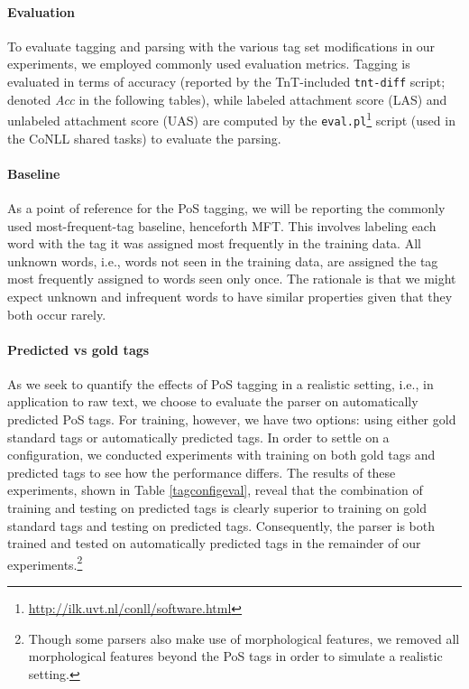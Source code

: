 \documentclass[11pt,a4paper]{article}
\begin{document}
\paragraph{Evaluation}
To evaluate tagging and parsing with the various tag set modifications in our
experiments, we employed commonly used evaluation metrics. Tagging is evaluated
in terms of accuracy (reported by the TnT-included \texttt{tnt-diff} script;
denoted \emph{Acc} in the following tables), while labeled attachment score
(LAS) and unlabeled attachment score (UAS) are computed by the
\texttt{eval.pl}\footnote{\url{http://ilk.uvt.nl/conll/software.html}} script
(used in the CoNLL shared tasks) to evaluate the parsing.

\paragraph{Baseline}
As a point of reference for the PoS tagging, we will be reporting the commonly
used most-frequent-tag baseline, henceforth MFT. This involves labeling each
word with the tag it was assigned most frequently in the training data. All
unknown words, i.e., words not seen in the training data, are assigned the tag
most frequently assigned to words seen only once. The rationale is that we
might expect unknown and infrequent words to have similar properties given that
they both occur rarely.

\paragraph{Predicted vs gold tags}
As we seek to quantify the effects of PoS tagging in a realistic setting, i.e.,
in application to raw text, we choose to evaluate the parser on automatically
predicted PoS tags. For training, however, we have two options: using either
gold standard tags or automatically predicted tags. In order to settle on a
configuration, we conducted experiments with training on both gold tags 
and predicted tags to see how the performance differs. The
results of these experiments, shown in Table \ref{tagconfigeval}, reveal that
the combination of training and testing on predicted tags is clearly superior
to training on gold standard tags and testing on predicted tags. Consequently,
the parser is both trained and tested on automatically predicted tags in the
remainder of our experiments.\footnote{Though some parsers also make use of
  morphological features, we removed all morphological features beyond the PoS
  tags in order to simulate a realistic setting.}
\end{document}
